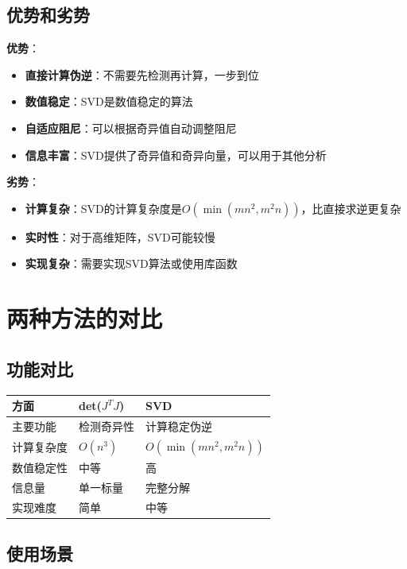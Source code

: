 \documentclass[12pt,a4paper]{article}
\begin{document}
\subsection{优势和劣势}

\textbf{优势}：
\begin{itemize}
\item \textbf{直接计算伪逆}：不需要先检测再计算，一步到位
\item \textbf{数值稳定}：SVD是数值稳定的算法
\item \textbf{自适应阻尼}：可以根据奇异值自动调整阻尼
\item \textbf{信息丰富}：SVD提供了奇异值和奇异向量，可以用于其他分析
\end{itemize}

\textbf{劣势}：
\begin{itemize}
\item \textbf{计算复杂}：SVD的计算复杂度是$O(\min(mn^2, m^2n))$，比直接求逆更复杂
\item \textbf{实时性}：对于高维矩阵，SVD可能较慢
\item \textbf{实现复杂}：需要实现SVD算法或使用库函数
\end{itemize}

\section{两种方法的对比}

\subsection{功能对比}

\begin{center}
\begin{tabular}{|l|l|l|}
\hline
\textbf{方面} & \textbf{det($J^T J$)} & \textbf{SVD} \\
\hline
主要功能 & 检测奇异性 & 计算稳定伪逆 \\
\hline
计算复杂度 & $O(n^3)$ & $O(\min(mn^2, m^2n))$ \\
\hline
数值稳定性 & 中等 & 高 \\
\hline
信息量 & 单一标量 & 完整分解 \\
\hline
实现难度 & 简单 & 中等 \\
\hline
\end{tabular}
\end{center}

\subsection{使用场景}
\end{document}
